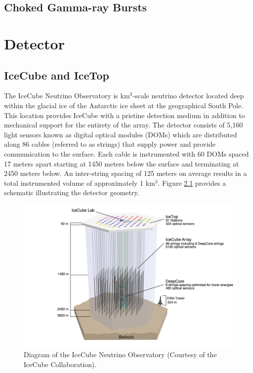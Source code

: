 \documentclass{gatech-thesis}
\begin{document}
\section{Choked Gamma-ray Bursts}



\chapter{Detector}
\section{IceCube and IceTop}
The IceCube Neutrino Observatory \cite{2006APh....26..155I} is km$^{3}$-scale neutrino detector located deep within the glacial ice of the Antarctic ice sheet at the geographical South Pole. This location provides IceCube with a pristine detection medium in addition to mechanical support for the entirety of the array. The detector consists of 5,160 light sensors known as digital optical modules (DOMs) which are distributed along 86 cables (referred to as strings) that supply power and provide communication to the surface. Each cable is instrumented with 60 DOMs spaced 17 meters apart starting at 1450 meters below the surface and terminating at 2450 meters below. An inter-string spacing of 125 meters on average results in a total instrumented volume of approximately 1 km$^{3}$. Figure \ref{fig:icecube} provides a schematic illustrating the detector geometry.

\begin{figure}[ht]
  \begin{center}
    \includegraphics[width=1.0\textwidth,keepaspectratio]{ArrayWSeasonsLabels.pdf}
  \end{center}
  \caption{Diagram of the IceCube Neutrino Observatory (Courtesy of the IceCube Collaboration).}
  \label{fig:icecube}
\end{figure}
\end{document}

